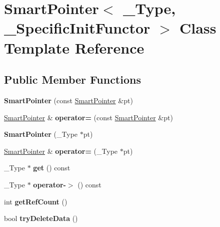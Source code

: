 \hypertarget{class_smart_pointer}{
\section{SmartPointer$<$ \_\-Type, \_\-SpecificInitFunctor $>$ Class Template Reference}
\label{class_smart_pointer}
}
\subsection*{Public Member Functions}
\begin{DoxyCompactItemize}
\item 
\hypertarget{class_smart_pointer_a1676167c44fedc953a94fa99e5852e30}{
{\bfseries SmartPointer} (const \hyperlink{class_smart_pointer}{SmartPointer} \&pt)}
\label{class_smart_pointer_a1676167c44fedc953a94fa99e5852e30}

\item 
\hypertarget{class_smart_pointer_a99b37b5f58637f95fa0efdc49736defe}{
\hyperlink{class_smart_pointer}{SmartPointer} \& {\bfseries operator=} (const \hyperlink{class_smart_pointer}{SmartPointer} \&pt)}
\label{class_smart_pointer_a99b37b5f58637f95fa0efdc49736defe}

\item 
\hypertarget{class_smart_pointer_a4f3ad9b5f46e22314027d8acad8c72c1}{
{\bfseries SmartPointer} (\_\-Type $\ast$pt)}
\label{class_smart_pointer_a4f3ad9b5f46e22314027d8acad8c72c1}

\item 
\hypertarget{class_smart_pointer_aa57959f0f4f7bee0a52466c9a2c9143c}{
\hyperlink{class_smart_pointer}{SmartPointer} \& {\bfseries operator=} (\_\-Type $\ast$pt)}
\label{class_smart_pointer_aa57959f0f4f7bee0a52466c9a2c9143c}

\item 
\hypertarget{class_smart_pointer_a74c9e603b144131118eb17ac52309d54}{
\_\-Type $\ast$ {\bfseries get} () const }
\label{class_smart_pointer_a74c9e603b144131118eb17ac52309d54}

\item 
\hypertarget{class_smart_pointer_a7976cda0613f2d098d4844e351291075}{
\_\-Type $\ast$ {\bfseries operator-\/$>$} () const }
\label{class_smart_pointer_a7976cda0613f2d098d4844e351291075}

\item 
\hypertarget{class_smart_pointer_a4a2ad2556fc958e8dda26c125acae0ca}{
int {\bfseries getRefCount} ()}
\label{class_smart_pointer_a4a2ad2556fc958e8dda26c125acae0ca}

\item 
\hypertarget{class_smart_pointer_a8a046005b19feb09293e620eb63a99b2}{
bool {\bfseries tryDeleteData} ()}
\label{class_smart_pointer_a8a046005b19feb09293e620eb63a99b2}

\end{DoxyCompactItemize}
